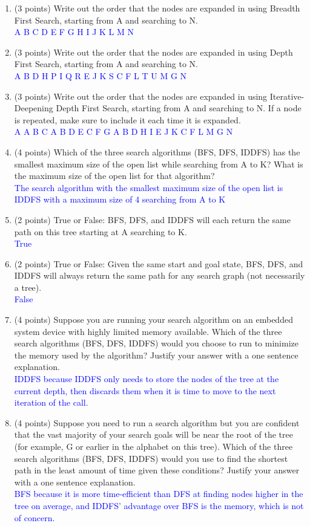 \documentclass[12pt]{article}
\newenvironment{qparts}{\begin{enumerate}[{(}a{)}]}{\end{enumerate}}
\begin{document}
\begin{qparts}
  \item (3 points) Write out the order that the nodes are expanded in using Breadth First Search, starting from A and searching to N.\\
  \textcolor{blue}{A B C D E F G H I J K L M N}
  \item (3 points) Write out the order that the nodes are expanded in using Depth First Search, starting from A and searching to N.\\
  \textcolor{blue}{A B D H P I Q R E J K S C F L T U M G N}
  \item (3 points) Write out the order that the nodes are expanded in using Iterative-Deepening Depth First Search, starting from A and searching to N. If a node is repeated, make sure to include it each time it is expanded.\\
  \textcolor{blue}{A A B C A B D E C F G A B D H I E J K C F L M G N}
  \item (4 points) Which of the three search algorithms (BFS, DFS, IDDFS) has the smallest maximum size of the open list while searching from A to K? What is the maximum size of the open list for that algorithm?\\
  \textcolor{blue}{The search algorithm with the smallest maximum size of the open list is IDDFS with a maximum size of 4 searching from A to K}
  \item (2 points) True or False: BFS, DFS, and IDDFS will each return the same path on this tree starting at A searching to K.\\
  \textcolor{blue}{True}
  \item (2 points) True or False: Given the same start and goal state, BFS, DFS, and IDDFS will always return the same path for any search graph (not necessarily a tree).\\
  \textcolor{blue}{False}
  \item (4 points) Suppose you are running your search algorithm on an embedded system device with highly limited memory available. Which of the three search algorithms (BFS, DFS, IDDFS) would you choose to run to minimize the memory used by the algorithm? Justify your answer with a one sentence explanation.\\
  \textcolor{blue}{IDDFS because IDDFS only needs to store the nodes of the tree at the current depth, then discards them when it is time to move to the next iteration of the call.}
  \item (4 points) Suppose you need to run a search algorithm but you are confident that the vast majority of your search goals will be near the root of the tree (for example, G or earlier in the alphabet on this tree). Which of the three search algorithms (BFS, DFS, IDDFS) would you use to find the shortest path in the least amount of time given these conditions? Justify your answer with a one sentence explanation.\\
  \textcolor{blue}{BFS because it is more time-efficient than DFS at finding nodes higher in the tree on average, and IDDFS' advantage over BFS is the memory, which is not of concern. }
\end{qparts}
\end{document}
